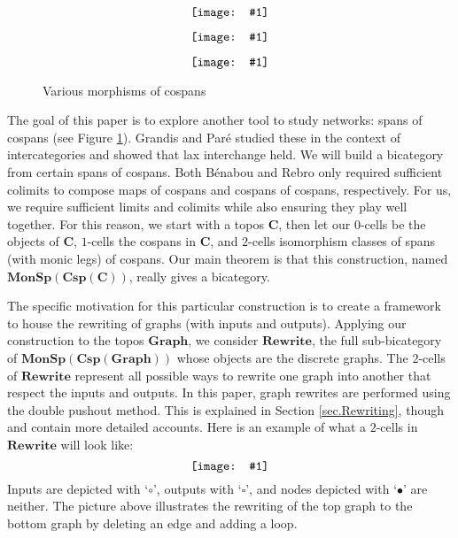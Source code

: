 \documentclass[11pt]{amsart}
\newcommand{\cat}[1]{\mathbf{#1}}
\newcommand{\diagram}[1]{\raisebox{-0.5\height}{\texttt{[image: \#1]}}}
\theoremstyle{remark}
\theoremstyle{definition}
\begin{document}
\begin{figure}
	\centering	
	\begin{minipage}[b]{0.3\textwidth}
	\[
		\diagram{Fig_MapOfCospans}
	\]
	\label{fig.MapOfCospans}
	\end{minipage}
	\begin{minipage}[b]{0.3\textwidth}
	\[
		\diagram{Fig_CospanOfCospans}
	\]
	\label{fig.CospanOfCospans}
	\end{minipage}
	\begin{minipage}[b]{0.3\textwidth}
	\[
		\diagram{Fig_SpanOfCospans}
	\]
	\label{fig.SpanOfCospans}
\end{minipage}
\caption{Various morphisms of cospans}
\end{figure}

The goal of this paper is to explore another tool to study networks: spans of cospans (see Figure \ref{fig.SpanOfCospans}). Grandis and Par\'{e} studied these in the context of intercategories and showed that lax interchange held.  We will build a bicategory from certain spans of cospans.  Both B\'{e}nabou and Rebro only required sufficient colimits to compose maps of cospans and cospans of cospans, respectively. For us, we require sufficient limits and colimits while also ensuring they play well together. For this reason, we start with a topos $\cat{C}$, then let our $0$-cells be the objects of $\cat{C}$, $1$-cells the cospans in $\cat{C}$, and $2$-cells isomorphism classes of spans (with monic legs) of cospans. Our main theorem is that this construction, named $\cat{MonSp(Csp(C))}$, really gives a bicategory. 

The specific motivation for this particular construction is to create a framework to house the rewriting of graphs (with inputs and outputs).  Applying our construction to the topos $\cat{Graph}$, we consider $\cat{Rewrite}$, the full sub-bicategory of $\cat{MonSp(Csp(Graph))}$ whose objects are the discrete graphs. The $2$-cells of $\cat{Rewrite}$ represent all possible ways to rewrite one graph into another that respect the inputs and outputs. In this paper, graph rewrites are performed using the double pushout method. This is explained in Section \ref{sec.Rewriting}, though \cite{Ehrig_GraphGramAlgAp} and \cite{LackSoboc_AdhesiveCategories} contain more detailed accounts. Here is an example of what a $2$-cells in $\cat{Rewrite}$ will look like:
\[
	\label{NoRef_IntroRewrite2Cell}
	\diagram{NoRef_IntroRewrite2Cell}
\]
Inputs are depicted with `$\circ$', outputs with `$\square$', and nodes depicted with `$\bullet$' are neither. The picture above illustrates the rewriting of the top graph to the bottom graph by deleting an edge and adding a loop. 
\end{document}
